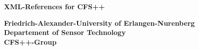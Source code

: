 \vspace*{40mm}

\begin{center}
{\Huge \bf XML-References for CFS++}

\vspace*{20mm}

{\large \bf 
Friedrich-Alexander-University of Erlangen-Nurenberg\\[2mm]
Departement of Sensor Technology}\\[5mm]
{\large \bf CFS++-Group}

\end{center}


